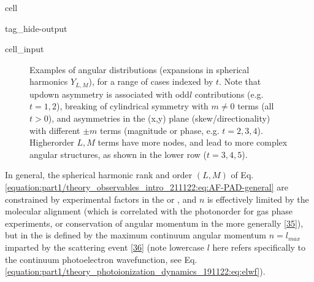 \documentclass[letterpaper,table,10pt,english]{jupyterBook}
\begin{document}
\begin{sphinxuseclass}{cell}
\begin{sphinxuseclass}{tag_hide-output}
\begin{sphinxVerbatimInput}
\begin{sphinxuseclass}{cell_input}
\begin{sphinxVerbatim}[commandchars=\\\{\}]
 \PYG{p}{[}\PYG{p}{]}   
\end{sphinxVerbatim}

\end{sphinxuseclass}\end{sphinxVerbatimInput}

\end{sphinxuseclass}
\end{sphinxuseclass}
\begin{figure}[htbp]
\centering
\capstart

\noindent{}
\caption{Examples of angular distributions (expansions in spherical harmonics \(Y_{L,M}\)), for a range of cases indexed by \(t\). Note that up\sphinxhyphen{}down asymmetry is associated with odd\sphinxhyphen{}\(l\) contributions (e.g. \(t=1,2\)), breaking of cylindrical symmetry with \(m\neq0\) terms (all \(t>0\)), and asymmetries in the (x,y) plane (skew/directionality) with different \(\pm m\) terms (magnitude or phase, e.g. \(t=2,3,4\)). Higher\sphinxhyphen{}order \(L,M\) terms have more nodes, and lead to more complex angular structures, as shown in the lower row (\(t=3,4,5\)).}\label{\detokenize{part1/theory_observables_intro_211122:fig-pads-example}}\end{figure}

\sphinxAtStartPar
In general, the spherical harmonic rank and order \((L,M)\) of Eq. \eqref{equation:part1/theory_observables_intro_211122:eq:AF-PAD-general} are constrained by experimental factors in the {\hyperref[\detokenize{backmatter/glossary:term-LF}]{}} or {\hyperref[\detokenize{backmatter/glossary:term-AF}]{}}, and \(n\) is effectively limited by the molecular alignment (which is correlated with the photon\sphinxhyphen{}order for gas phase experiments, or conservation of angular momentum in the {\hyperref[\detokenize{backmatter/glossary:term-LF}]{}} more generally {[}\hyperlink{cite.backmatter/bibliography:id872}{35}{]}), but in the {\hyperref[\detokenize{backmatter/glossary:term-MF}]{}} is defined by the maximum continuum angular momentum \(n=l_{max}\) imparted by the scattering event {[}\hyperlink{cite.backmatter/bibliography:id523}{36}{]} (note lower\sphinxhyphen{}case \(l\) here refers specifically to the continuum photoelectron wavefunction, see Eq. \eqref{equation:part1/theory_photoionization_dynamics_191122:eq:elwf}).
\end{document}
